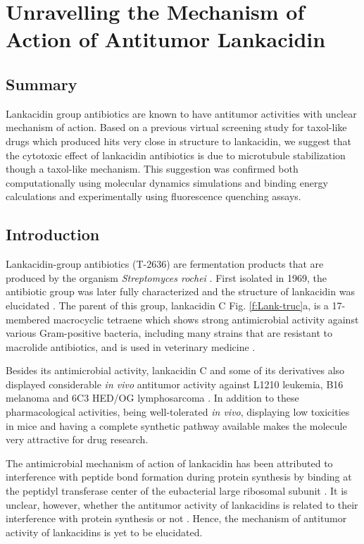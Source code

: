 \documentclass[11pt]{report}
\begin{document}
\bigskip 

\chapter{Unravelling the Mechanism of Action of Antitumor Lankacidin}
\label{lankacidin}

\section{Summary}

Lankacidin group antibiotics are known to have antitumor activities with unclear
mechanism of action. Based on a previous virtual screening study for
taxol-like drugs which
produced hits very close in structure to lankacidin, we suggest
that the cytotoxic effect of lankacidin antibiotics is due to microtubule
stabilization though a taxol-like mechanism. This suggestion was confirmed
both computationally using molecular dynamics simulations and binding energy calculations and experimentally using fluorescence quenching assays.

\section{Introduction}

Lankacidin-group antibiotics (T-2636) are fermentation products that are produced by the
organism \emph{Streptomyces rochei}
\cite{Harada1969}. First isolated in 1969, the antibiotic
group was later
fully characterized and the structure of lankacidin was
elucidated \cite{Harada1971,Harada1973,Harada1973b,Harada1974}.
The parent of this group, lankacidin C Fig. \ref{f:Lank-truc}a, is a 17-membered macrocyclic tetraene which shows
strong antimicrobial activity against various Gram-positive
bacteria, including many strains that are resistant to 
macrolide antibiotics, and 
is used in veterinary medicine \cite{Tsuchiya1971}. 

Besides its
antimicrobial activity, lankacidin C and
some of its derivatives
also displayed considerable \emph{in vivo} antitumor
activity against L1210 leukemia, B16 melanoma and
6C3 HED/OG lymphosarcoma \cite{Ootsu1973,Ootsu1975}.
In addition to these pharmacological activities, being well-tolerated \emph{in vivo}, 
displaying low toxicities in mice
\cite{Harada1973b} and having a complete synthetic 
pathway available \cite{Kende1995} makes the molecule very attractive for drug research.

The antimicrobial mechanism of action
of lankacidin has been attributed to interference with
peptide bond formation during
protein synthesis by binding at the peptidyl transferase center of the eubacterial large ribosomal subunit
\cite{Auerbach2010,Belousoff2011}.
It is unclear, however, whether the antitumor
activity of lankacidins is related to their interference
with protein synthesis or not \cite{Ootsu1975}.
Hence, the mechanism of antitumor activity of lankacidins
is yet to be elucidated. 
\end{document}
